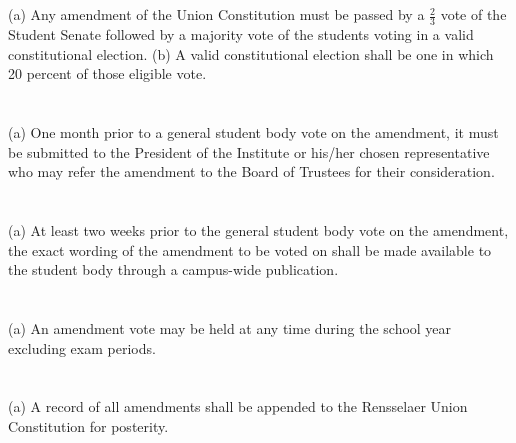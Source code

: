 
\section{}
(a) Any amendment of the Union Constitution must be passed by a $\frac{2}{3}$ vote of the Student Senate
followed by a majority vote of the students voting in a valid constitutional election.
(b) A valid constitutional election shall be one in which 20 percent of those eligible vote.

\section{}
(a) One month prior to a general student body vote on the amendment, it must be submitted to the
President of the Institute or his/her chosen representative who may refer the amendment to 
the Board of Trustees for their consideration.

\section{}
(a) At least two weeks prior to the general student body vote on the amendment, the exact
wording of the amendment to be voted on shall be made available to the student body through
a campus-wide publication.

\section{}
(a) An amendment vote may be held at any time during the school year excluding exam periods.

\section{}
(a) A record of all amendments shall be appended to the Rensselaer Union Constitution for
posterity.